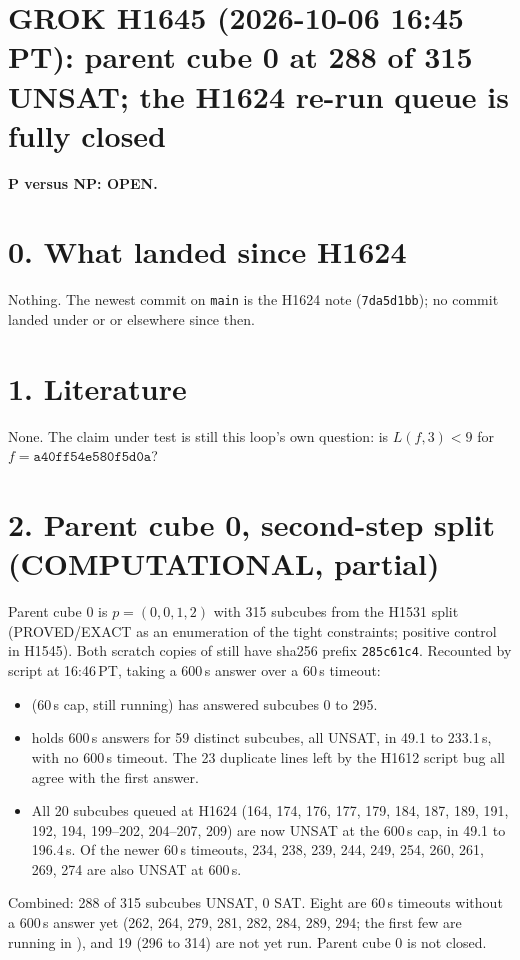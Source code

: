 \documentclass[11pt]{article}
\begin{document}
\sloppy
\section*{GROK H1645 (2026-10-06 16:45 PT): parent cube 0 at 288 of 315 UNSAT; the H1624 re-run queue is fully closed}
\textbf{P versus NP: OPEN.}

\section*{0. What landed since H1624}
Nothing. The newest commit on \texttt{main} is the H1624 note (\texttt{7da5d1bb}); no commit landed under  or  or elsewhere since then.

\section*{1. Literature}
None. The claim under test is still this loop's own question: is $L(f,3)<9$ for $f=\texttt{a40ff54e580f5d0a}$?

\section*{2. Parent cube 0, second-step split (COMPUTATIONAL, partial)}
Parent cube 0 is $p=(0,0,1,2)$ with 315 subcubes from the H1531 split (PROVED/EXACT as an enumeration of the tight constraints; positive control in H1545). Both scratch copies of  still have sha256 prefix \texttt{285c61c4}. Recounted by script at 16:46\,PT, taking a 600\,s answer over a 60\,s timeout:
\begin{itemize}
\item {} (60\,s cap, still running) has answered subcubes 0 to 295.
\item {} holds 600\,s answers for 59 distinct subcubes, all UNSAT, in 49.1 to 233.1\,s, with no 600\,s timeout. The 23 duplicate lines left by the H1612 script bug all agree with the first answer.
\item All 20 subcubes queued at H1624 (164, 174, 176, 177, 179, 184, 187, 189, 191, 192, 194, 199--202, 204--207, 209) are now UNSAT at the 600\,s cap, in 49.1 to 196.4\,s. Of the newer 60\,s timeouts, 234, 238, 239, 244, 249, 254, 260, 261, 269, 274 are also UNSAT at 600\,s.
\end{itemize}
Combined: 288 of 315 subcubes UNSAT, 0 SAT. Eight are 60\,s timeouts without a 600\,s answer yet (262, 264, 279, 281, 282, 284, 289, 294; the first few are running in ), and 19 (296 to 314) are not yet run. Parent cube 0 is not closed.
\end{document}
